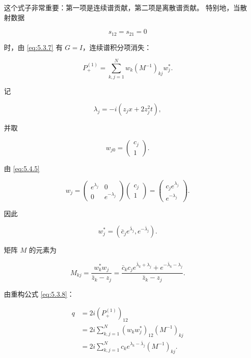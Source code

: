 \documentclass[
    lang=cn,
    scheme=chinese,
    mode=simple,
    device=normal,
    color=blue,
    math=cm,
    thmcnt=section,
    12pt
]{elegantbook}
\begin{document}
这个式子非常重要：第一项是连续谱贡献，第二项是离散谱贡献。
特别地，当散射数据

\[
    s_{12}=s_{21}=0
\]

时，由 \eqref{eq:5.3.7} 有 $G=I$，连续谱积分项消失：

\[
    P_+^{(1)}
    =
    \sum\limits_{k,j=1}^{N}
    w_k(M^{-1})_{kj}w_j^*.
\]

记

\[
    \lambda_j
    =
    -i(z_jx+2z_j^2t),
\]

并取

\[
    w_{j0}
    =
    \begin{pmatrix}
        c_j \\1
    \end{pmatrix}.
\]

由 \eqref{eq:5.4.5}

\begin{equation}
    w_j
    =
    \begin{pmatrix}
        e^{\lambda_j} & 0              \\
        0             & e^{-\lambda_j}
    \end{pmatrix}
    \begin{pmatrix}
        c_j \\1
    \end{pmatrix}
    =
    \begin{pmatrix}
        c_je^{\lambda_j} \\
        e^{-\lambda_j}
    \end{pmatrix}.
    \tag{5.4.10}
    \label{eq:5.4.10}
\end{equation}

因此

\begin{equation}
    w_j^*
    =
    \left(
    \bar c_je^{\bar\lambda_j},
    e^{-\bar\lambda_j}
    \right).
    \tag{5.4.11}
    \label{eq:5.4.11}
\end{equation}

矩阵 $M$ 的元素为

\begin{equation}
    M_{kj}
    =
    \dfrac{w_k^*w_j}{\bar z_k-z_j}
    =
    \dfrac{
        \bar c_kc_je^{\bar\lambda_k+\lambda_j}
        +
        e^{-\bar\lambda_k-\lambda_j}
    }{
        \bar z_k-z_j
    }.
    \tag{5.4.12}
    \label{eq:5.4.12}
\end{equation}

由重构公式 \eqref{eq:5.3.8}：

\begin{equation}
    \begin{aligned}
        q
         & =
        2i(P_+^{(1)})_{12}           \\
         & =
        2i
        \sum\limits_{k,j=1}^{N}
        (w_kw_j^*)_{12}(M^{-1})_{kj} \\
         & =
        2i
        \sum\limits_{k,j=1}^{N}
        c_ke^{\lambda_k-\bar\lambda_j}(M^{-1})_{kj}.
    \end{aligned}
    \tag{5.4.13}
    \label{eq:5.4.13}
\end{equation}
\end{document}
